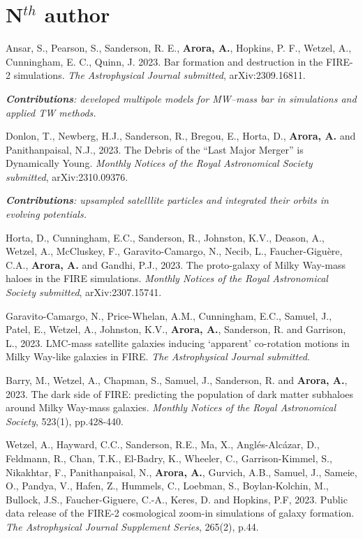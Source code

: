 \documentclass[UTF8]{article}
\begin{document}
\section*{N$^{th}$ author}
\begin{etaremune}

\item Ansar, S., Pearson, S., Sanderson, R. E., \textbf{Arora, A.}, Hopkins, P. F., Wetzel, A., Cunningham, E. C., Quinn, J. 2023. Bar formation and destruction in the FIRE-2 simulations. \textit{The Astrophysical Journal submitted}, arXiv:2309.16811. 

\textit{\textbf{Contributions}: developed multipole models for MW--mass bar in simulations and applied TW methods.}

\item Donlon, T., Newberg, H.J., Sanderson, R., Bregou, E., Horta, D., \textbf{Arora, A.} and Panithanpaisal, N.J., 2023. The Debris of the ``Last Major Merger'' is Dynamically Young. \textit{Monthly Notices of the Royal Astronomical Society submitted}, arXiv:2310.09376. 

\textit{\textbf{Contributions}: upsampled satelllite particles and integrated their orbits in evolving potentials.}

\item Horta, D., Cunningham, E.C., Sanderson, R., Johnston, K.V., Deason, A., Wetzel, A., McCluskey, F., Garavito-Camargo, N., Necib, L., Faucher-Giguère, C.A., \textbf{Arora, A.} and Gandhi, P.J., 2023. The proto-galaxy of Milky Way-mass haloes in the FIRE simulations. \textit{Monthly Notices of the Royal Astronomical Society submitted}, arXiv:2307.15741. 

\item Garavito-Camargo, N., Price-Whelan, A.M.,  Cunningham, E.C., Samuel, J., Patel, E., Wetzel, A., Johnston, K.V., \textbf{Arora, A.}, Sanderson, R. and Garrison, L., 2023. LMC-mass satellite galaxies inducing ‘apparent’ co-rotation motions in Milky Way-like galaxies in
FIRE. \textit{The Astrophysical Journal submitted}.

\item Barry, M., Wetzel, A., Chapman, S., Samuel, J., Sanderson, R. and \textbf{Arora, A.}, 2023. The dark side of FIRE: predicting the population of dark matter subhaloes around Milky Way-mass galaxies. \textit{Monthly Notices of the Royal Astronomical Society}, 523(1), pp.428-440. 

\item Wetzel, A., Hayward, C.C., Sanderson, R.E., Ma, X., Anglés-Alcázar, D., Feldmann, R., Chan, T.K., El-Badry, K., Wheeler, C., Garrison-Kimmel, S., Nikakhtar, F., Panithanpaisal, N., \textbf{Arora, A.}, Gurvich, A.B., Samuel, J., Sameie, O., Pandya, V., Hafen, Z., Hummels, C., Loebman, S., Boylan-Kolchin, M., Bullock, J.S., Faucher-Giguere, C.-A., Keres, D. and Hopkins, P.F, 2023. Public data release of the FIRE-2 cosmological zoom-in simulations of galaxy formation. \textit{The Astrophysical Journal Supplement Series}, 265(2), p.44.


\end{etaremune}
\end{document}
